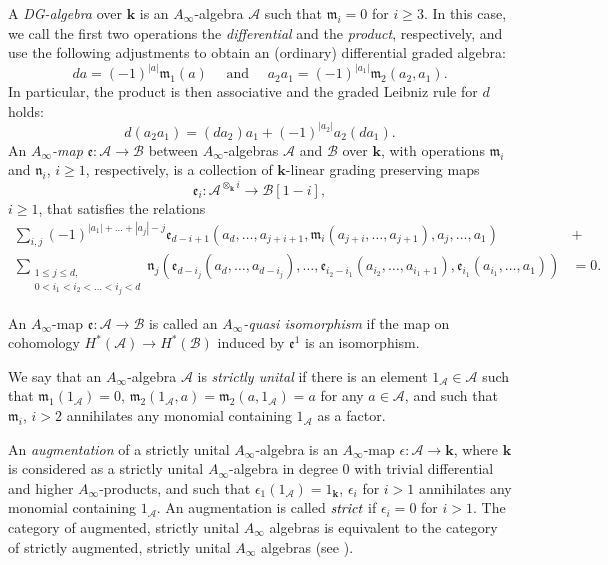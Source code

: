\documentclass{gtpart}
\renewcommand{\k}{\mathbf{k}}
\newcommand{\m}{\mathfrak{m}}
\newcommand{\n}{\mathfrak{n}}
\newcommand{\e}{\mathfrak{e}}
\newcommand{\A}{\mathscr{A}}
\newcommand{\B}{\mathscr{B}}
\begin{document}
A \emph{DG-algebra} over $\k$ is an $A_\infty$-algebra $\A$ such that $\m_i =0$ for $i \geq 3$. In this
case, we call the first two operations the \emph{differential} and the \emph{product}, respectively, and use the following adjustments to obtain an (ordinary) differential graded algebra: 
\begin{equation} \label{left} 
    d a = (-1)^{|a|} \m_1(a) \quad \text{ and } \quad a_2 a_1 = (-1)^{|a_1|} \m_2(a_2,a_1). 
\end{equation}
In particular, the product is then associative and the graded Leibniz rule for $d$ holds:
\begin{equation} \label{Leib} 
    d(a_2 a_1) = (d a_2) a_1 + (-1)^{|a_2|} a_2 (da_1). 
\end{equation}
An \emph{$A_{\infty}$-map} $\e\colon\A\to\B$ between $A_{\infty}$-algebras $\A$ and $\B$ over $\k$, with operations $\m_i$ and $\n_{i}$, $i\ge 1$, respectively, is a collection of $\k$-linear grading preserving maps 
\[ 
\e_i \colon \A^{\otimes_\k i } \to \B [1-i],  
\]
$i\ge 1$, that satisfies the relations
\begin{align*} 
\sum_{i,j} (-1)^{|a_1|+\ldots + |a_j|-j} 
\e_{d-i+1}\left(a_d,\ldots, a_{j+i+1},\m_i(a_{j+i},\ldots, a_{j+1}), a_j,\ldots, a_1\right) \ &+ \\ 
\sum_{\begin{smallmatrix}
1\le j\le d, \\
0<i_{1}<i_{2}<\dots<i_{j}<d
\end{smallmatrix}}  
\n_{j}\left(\e_{d-i_{j}}(a_d,\ldots,a_{d-i_{j}}),\ldots,\e_{i_2-i_1}(a_{i_2},\ldots,a_{i_1+1}), \e_{i_1}(a_{i_1},\ldots, a_{1})\right)&= 0. 
\end{align*}

An $A_\infty$-map $\e \colon \A \to \B$ is called an \emph{$A_\infty$-quasi isomorphism} if the map on
cohomology $H^*(\A) \to H^*(\B)$ induced by $\e^1$ is an isomorphism.

We say that an $A_{\infty}$-algebra $\A$ is \emph{strictly unital} if there is
an element $1_\A \in\A$ such that $\m_1(1_\A)=0$, $\m_2(1_\A,a)=\m_{2}(a,1_\A)=a$ for any $a\in\A$, and such that
$\m_{i}$, $i > 2$ annihilates any monomial containing $1_\A$ as a factor.  

An \emph{augmentation} of a strictly unital $A_\infty$-algebra is an $A_\infty$-map $\epsilon \colon \A \to \k$,
where $\k$ is considered as a strictly unital $A_\infty$-algebra in degree 0 with trivial
differential and higher $A_\infty$-products, and such
that $\epsilon_1 (1_\A)=1_\k$, $\epsilon_i$ for $i>1$ annihilates any monomial containing $1_\A$.
An augmentation is called $\emph{strict}$ if $\epsilon_{i}=0$ for $i>1$. The category of
augmented, strictly unital $A_\infty$ algebras is equivalent to the category of strictly
augmented, strictly unital $A_\infty$ algebras (see \cite[Section 7.2]{Posit}). 
\end{document}

